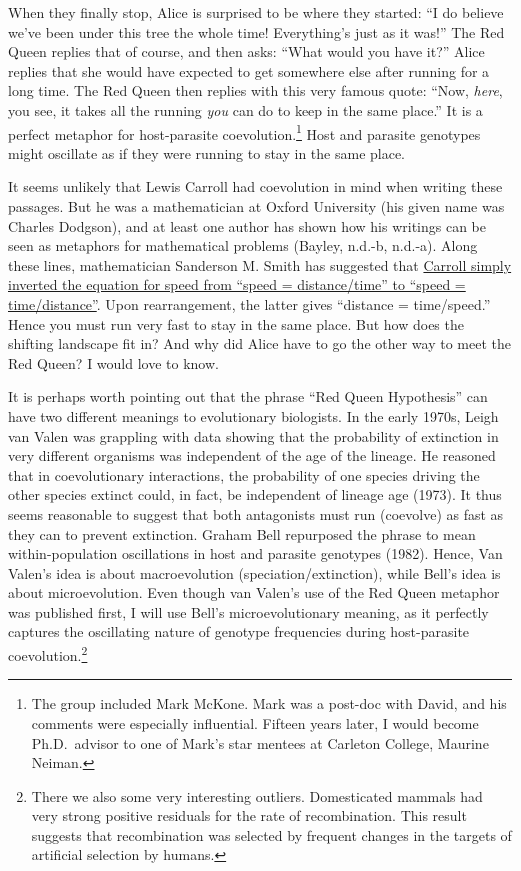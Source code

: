 \documentclass[
  letterpaper,
]{book}
\begin{document}
When they finally stop, Alice is surprised to be where they started: ``I
do believe we've been under this tree the whole time! Everything's just
as it was!'' The Red Queen replies that of course, and then asks: ``What
would you have it?'' Alice replies that she would have expected to get
somewhere else after running for a long time. The Red Queen then replies
with this very famous quote: ``Now, \emph{here}, you see, it takes all
the running \emph{you} can do to keep in the same place.'' It is a
perfect metaphor for host-parasite coevolution.\footnote{The group
  included Mark McKone. Mark was a post-doc with David, and his comments
  were especially influential. Fifteen years later, I would become
  Ph.D.~advisor to one of Mark's star mentees at Carleton College,
  Maurine Neiman.} Host and parasite genotypes might oscillate as if
they were running to stay in the same place.

It seems unlikely that Lewis Carroll had coevolution in mind when
writing these passages. But he was a mathematician at Oxford University
(his given name was Charles Dodgson), and at least one author has shown
how his writings can be seen as metaphors for mathematical problems
(Bayley, n.d.-b, n.d.-a). Along these lines, mathematician Sanderson M.
Smith has suggested that
\href{http://www.herkimershideaway.org/writings/carroll.htm}{Carroll
simply inverted the equation for speed from ``speed = distance/time'' to
``speed = time/distance''}. Upon rearrangement, the latter gives
``distance = time/speed.'' Hence you must run very fast to stay in the
same place. But how does the shifting landscape fit in? And why did
Alice have to go the other way to meet the Red Queen? I would love to
know.

It is perhaps worth pointing out that the phrase ``Red Queen
Hypothesis'' can have two different meanings to evolutionary biologists.
In the early 1970s, Leigh van Valen was grappling with data showing that
the probability of extinction in very different organisms was
independent of the age of the lineage. He reasoned that in
coevolutionary interactions, the probability of one species driving the
other species extinct could, in fact, be independent of lineage age
(1973). It thus seems reasonable to suggest that both antagonists must
run (coevolve) as fast as they can to prevent extinction. Graham Bell
repurposed the phrase to mean within-population oscillations in host and
parasite genotypes (1982). Hence, Van Valen's idea is about
macroevolution (speciation/extinction), while Bell's idea is about
microevolution. Even though van Valen's use of the Red Queen metaphor
was published first, I will use Bell's microevolutionary meaning, as it
perfectly captures the oscillating nature of genotype frequencies during
host-parasite coevolution.\footnote{There we also some very interesting
  outliers. Domesticated mammals had very strong positive residuals for
  the rate of recombination. This result suggests that recombination was
  selected by frequent changes in the targets of artificial selection by
  humans.}
\end{document}
